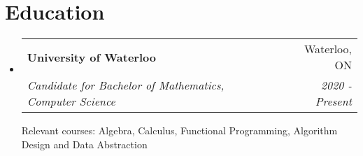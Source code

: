 \documentclass[letterpaper,11pt]{article}
\makeatletter
\newcommand{\resumeSubheading}[4]{
  \vspace{-1pt}\item[]
  \begin{tabular*}{0.98\textwidth}{l@{\extracolsep{\fill}}r}
      \hspace{-10pt}\textbf{#1} & #2 \\
      \hspace{-10pt}\textit{\small#3} & \textit{\small #4} \\
    \end{tabular*}\vspace{-5pt}
}
\newcommand{\resumeSubHeadingListStart}{\begin{itemize}[leftmargin=*]}
\newcommand{\resumeSubHeadingListEnd}{\end{itemize}}
\newcommand{\shorterSection}[1]{\vspace{-10pt}\section{#1}}
\makeatother
\begin{document}
\shorterSection{Education}
  \resumeSubHeadingListStart
    \resumeSubheading
      {University of Waterloo}{Waterloo, ON}
      {Candidate for Bachelor of Mathematics, Computer Science}{2020 - Present}{

          \hspace{-12pt} Relevant courses: Algebra, Calculus, Functional Programming, Algorithm Design and Data Abstraction      }

  \resumeSubHeadingListEnd
\end{document}
